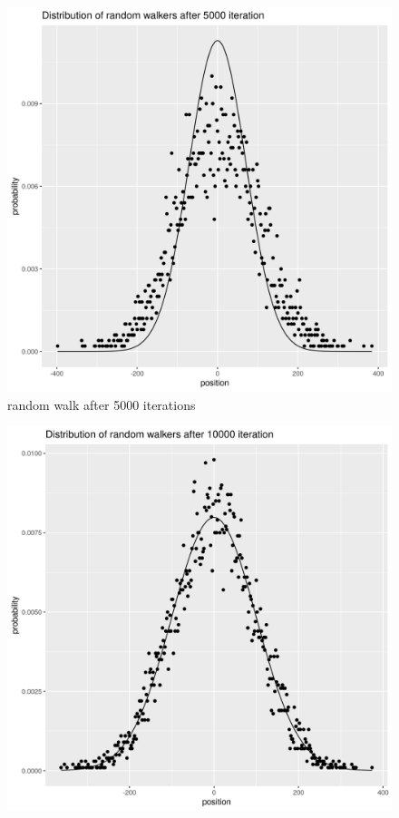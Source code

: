 \documentclass[a4paper]{article}
\begin{document}
\begin{enumerate}[label={(2. \alph*)}]
        \begin{figure}
            \includegraphics[width=\linewidth]{./random_walk5000.png}
            \caption{random walk after 5000 iterations}
            \label{fig:rw5000}
        \end{figure}
        \begin{figure}
            \includegraphics[width=\linewidth]{./random_walk10000.png}

\end{figure}
\end{enumerate}
\end{document}
